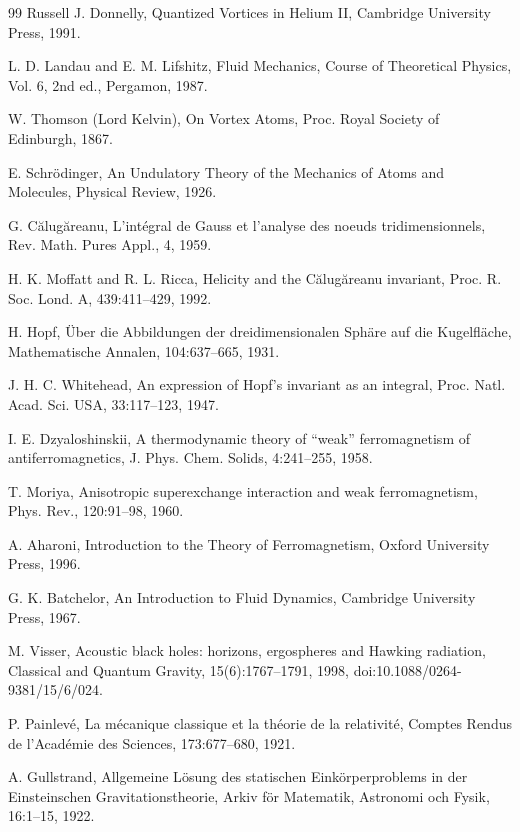 \begin{thebibliography}{99}
     Russell J. Donnelly, Quantized Vortices in Helium II, Cambridge University Press, 1991.

     L. D. Landau and E. M. Lifshitz, Fluid Mechanics, Course of Theoretical Physics, Vol. 6, 2nd ed., Pergamon, 1987.

     W. Thomson (Lord Kelvin), On Vortex Atoms, Proc. Royal Society of Edinburgh, 1867.

     E. Schr{\"o}dinger, An Undulatory Theory of the Mechanics of Atoms and Molecules, Physical Review, 1926.

     G. C\u{a}lug\u{a}reanu, L'int\'egral de Gauss et l'analyse des noeuds tridimensionnels, Rev. Math. Pures Appl., 4, 1959.

     H. K. Moffatt and R. L. Ricca, Helicity and the C\u{a}lug\u{a}reanu invariant, Proc. R. Soc. Lond. A, 439:411--429, 1992.

     H. Hopf, \"Uber die Abbildungen der dreidimensionalen Sph\"are auf die Kugelfl\"ache, Mathematische Annalen, 104:637--665, 1931.

     J. H. C. Whitehead, An expression of Hopf's invariant as an integral, Proc. Natl. Acad. Sci. USA, 33:117--123, 1947.

     I. E. Dzyaloshinskii, A thermodynamic theory of ``weak'' ferromagnetism of antiferromagnetics, J. Phys. Chem. Solids, 4:241--255, 1958.

     T. Moriya, Anisotropic superexchange interaction and weak ferromagnetism, Phys. Rev., 120:91--98, 1960.

     A. Aharoni, Introduction to the Theory of Ferromagnetism, Oxford University Press, 1996.

     G. K. Batchelor, An Introduction to Fluid Dynamics, Cambridge University Press, 1967.

     M. Visser, Acoustic black holes: horizons, ergospheres and Hawking radiation, Classical and Quantum Gravity, 15(6):1767--1791, 1998, doi:10.1088/0264-9381/15/6/024.

     P. Painlev{\'e}, La m{\'e}canique classique et la th{\'e}orie de la relativit{\'e}, Comptes Rendus de l'Acad{\'e}mie des Sciences, 173:677--680, 1921.

     A. Gullstrand, Allgemeine L{\"o}sung des statischen Eink{\"o}rperproblems in der Einsteinschen Gravitationstheorie, Arkiv f{\"o}r Matematik, Astronomi och Fysik, 16:1--15, 1922.


\end{thebibliography}
